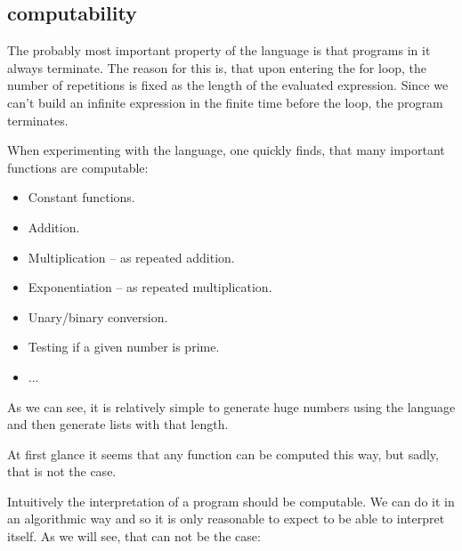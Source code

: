 \subsection{\FOR computability}
The probably most important property of the \FOR language is that programs in 
it always terminate. The reason for this is, that upon entering the for loop, 
the number of repetitions is fixed as the length of the evaluated expression. 
Since we can't build an infinite expression in the finite time before the 
loop, the program terminates.

When experimenting with the language, one quickly finds, that many important 
functions are \FOR computable:

\begin{itemize}
	\item Constant functions.
	\item Addition.
	\item Multiplication -- as repeated addition.
	\item Exponentiation -- as repeated multiplication.
	\item Unary/binary conversion.
	\item Testing if a given number is prime.
	\item ...
\end{itemize}

As we can see, it is relatively simple to generate huge numbers using the 
\FOR language and then generate lists with that length.


At first glance it seems that any function can be computed this way, but 
sadly, that is not the case.

Intuitively the interpretation of a \FOR program should be computable. We can 
do it in an algorithmic way and so it is only reasonable to expect \FOR to be 
able to interpret itself. As we will see, that can not be the case:

